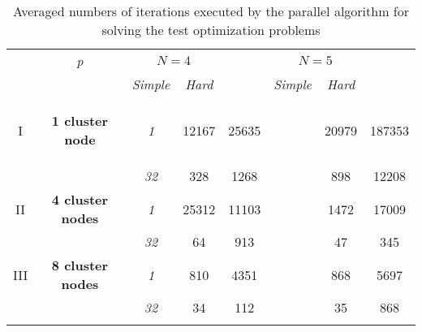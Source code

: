 \documentclass{svproc}
\begin{document}
\begin{table}
  \centering
  \caption{Averaged numbers of iterations executed by the parallel algorithm for solving the test
optimization problems}
  \label{tab:iterations}
  \begin{tabular}{cccccccc}
    \cline{3-8}\noalign{\smallskip}
    \multicolumn{2}{c}{  } & \textit{p} & \multicolumn{2}{c}{$N=4$} & &
\multicolumn{2}{c}{$N=5$}   \\
    \noalign{\smallskip} \cline{4-5} \cline{7-8}  \noalign{\smallskip}
    \multicolumn{2}{c}{  } & & \textit{Simple} & \textit{Hard} & & \textit{Simple} &
\textit{Hard}  \\
    \noalign{\smallskip}\hline
    I &
    \parbox{0.25\textwidth}{
    \begin{center}
    \textbf{1 cluster node}
    \end{center}		}
      & \textit{1} & 12167 & 25635 & & 20979 & 187353  \\
    &  & \textit{32} & 328 & 1268  & &   898 & 12208 \\
    \hline \noalign{\smallskip}
II  & \textbf{4 cluster nodes}  %
  & \textit{1} & 25312 & 11103 & & 1472 & 17009 \\
&   & \textit{32} & 64 &   913 & & 47 & 345 \\
    \noalign{\smallskip}\hline	\noalign{\smallskip}
III & \textbf{8 cluster nodes} %
  & \textit{1}  & 810 & 4351 & & 868 & 5697  \\
& & \textit{32} & 34  & 112  & & 35  & 868 \\
    \noalign{\smallskip}\hline
  \end{tabular}
\end{table}
\end{document}
